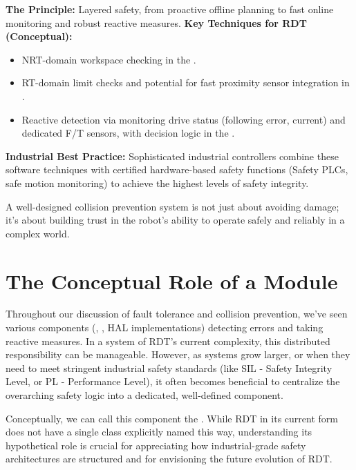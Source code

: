 \textbf{The Principle:} Layered safety, from proactive offline planning to fast online monitoring and robust reactive measures.
\textbf{Key Techniques for RDT (Conceptual):}
        \begin{itemize}
            \item NRT-domain workspace checking in the .
            \item RT-domain limit checks and potential for fast proximity sensor integration in .
            \item Reactive detection via monitoring drive status (following error, current) and dedicated F/T sensors, with decision logic in the .
        \end{itemize}
\textbf{Industrial Best Practice:} Sophisticated industrial controllers combine these software techniques with certified hardware-based safety functions (Safety PLCs, safe motion monitoring) to achieve the highest levels of safety integrity.

A well-designed collision prevention system is not just about avoiding damage; it's about building trust in the robot's ability to operate safely and reliably in a complex world.



\section{The Conceptual Role of a  Module}
\label{sec:safety_supervisor_conceptual}

Throughout our discussion of fault tolerance and collision prevention, we've seen various components (, , HAL implementations) detecting errors and taking reactive measures. In a system of RDT's current complexity, this distributed responsibility can be manageable. However, as systems grow larger, or when they need to meet stringent industrial safety standards (like SIL - Safety Integrity Level, or PL - Performance Level), it often becomes beneficial to centralize the overarching safety logic into a dedicated, well-defined component.

Conceptually, we can call this component the \textbf{}. While RDT in its current form does not have a single class explicitly named this way, understanding its hypothetical role is crucial for appreciating how industrial-grade safety architectures are structured and for envisioning the future evolution of RDT.

